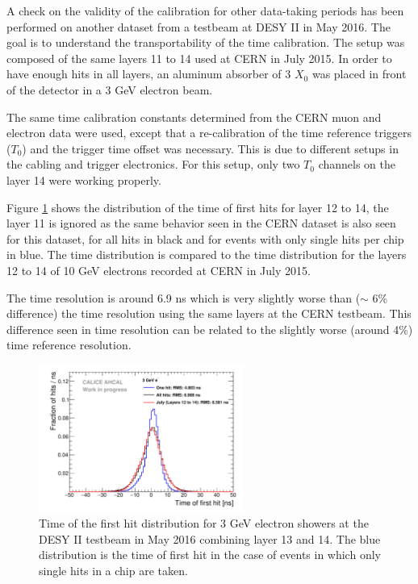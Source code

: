 A check on the validity of the calibration for other data-taking periods has been performed on another dataset from a testbeam at DESY II in May 2016. The goal is to understand the transportability of the time calibration. The setup was composed of the same layers 11 to 14 used at CERN in July 2015. In order to have enough hits in all layers, an aluminum absorber of 3 $X_{0}$ was placed in front of the detector in a 3 GeV electron beam.

The same time calibration constants determined from the CERN muon and electron data were used, except that a re-calibration of the time reference triggers ($T_{0}$) and the trigger time offset was necessary. This is due to different setups in the cabling and trigger electronics. For this setup, only two $T_{0}$ channels on the layer 14 were working properly.

Figure \ref{fig:TBMay2016} shows the distribution of the time of first hits for layer 12 to 14, the layer 11 is ignored as the same behavior seen in the CERN dataset is also seen for this dataset, for all hits in black and for events with only single hits per chip in blue. The time distribution is compared to the time distribution for the layers 12 to 14 of 10 GeV electrons recorded at CERN in July 2015.

The time resolution is around 6.9 ns which is very slightly worse than ($\sim$ 6\% difference) the time resolution using the same layers at the CERN testbeam. This difference seen in time resolution can be related to the slightly worse (around 4\%) time reference resolution.

\begin{figure}[htbp!]
	\centering
	\includegraphics[width=0.6\textwidth]{../Thesis_Plots/Timing/Electrons/Plots/Timing_May2016_BigLayers.pdf}
	\caption{Time of the first hit distribution for 3 GeV electron showers at the DESY II testbeam in May 2016 combining layer 13 and 14. The blue distribution is the time of first hit in the case of events in which only single hits in a chip are taken.}\label{fig:TBMay2016}
\end{figure}

